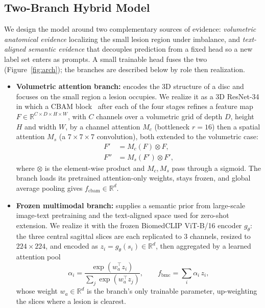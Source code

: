 \documentclass[runningheads]{llncs}
\begin{document}
\subsection{Two-Branch Hybrid Model}\label{wf}

We design the model around two complementary sources of evidence: \emph{volumetric anatomical evidence} localizing the small lesion region under imbalance, and \emph{text-aligned semantic evidence} that decouples prediction from a fixed head so a new label set enters as prompts. A small trainable head fuses the two (Figure~\ref{fig:arch}); the branches are described below by role then realization.
\begin{itemize}
\item \textbf{Volumetric attention branch:} encodes the 3D structure of a disc and focuses on the small region a lesion occupies. We realize it as a 3D ResNet-34 in which a CBAM block~\cite{woo2018cbam} after each of the four stages refines a feature map $F \in \mathbb{R}^{C \times D \times H \times W}$, with $C$ channels over a volumetric grid of depth $D$, height $H$ and width $W$, by a channel attention $M_c$ (bottleneck $r=16$) then a spatial attention $M_s$ (a $7\!\times\!7\!\times\!7$ convolution), both extended to the volumetric case:
\begin{align}
F' &= M_c(F) \otimes F, \label{eq:cbam_c}\\
F'' &= M_s(F') \otimes F', \label{eq:cbam_s}
\end{align}
where $\otimes$ is the element-wise product and $M_c, M_s$ pass through a sigmoid. The branch loads its pretrained attention-only weights, stays frozen, and global average pooling gives $f_{\text{cbam}} \in \mathbb{R}^{d}$.

\item \textbf{Frozen multimodal branch:} supplies a semantic prior from large-scale image-text pretraining and the text-aligned space used for zero-shot extension. We realize it with the frozen BiomedCLIP ViT-B/16 encoder $g_\theta$: the three central sagittal slices are each replicated to 3 channels, resized to $224\times224$, and encoded as $z_i = g_\theta(s_i) \in \mathbb{R}^{d}$, then aggregated by a learned attention pool
\begin{equation}
\alpha_i = \frac{\exp(w_a^\top z_i)}{\sum_{j} \exp(w_a^\top z_j)},
\qquad
f_{\text{bmc}} = \sum_{i} \alpha_i \, z_i,
\label{eq:slicepool}
\end{equation}
whose weight $w_a \in \mathbb{R}^{d}$ is the branch's only trainable parameter, up-weighting the slices where a lesion is clearest.


\end{itemize}
\end{document}
